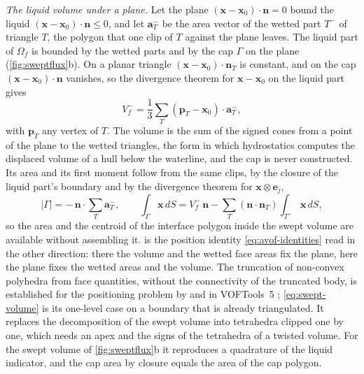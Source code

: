 \documentclass[preprint,12pt]{elsarticle}
\newcommand{\x}{\mathbf{x}}
\newcommand{\n}{\mathbf{n}}
\begin{document}
\emph{The liquid volume under a plane.} Let the plane $(\x - \x_0)\cdot\n = 0$ bound the liquid $(\x - \x_0)\cdot\n \le 0$, and let $\mathbf{a}_T^-$ be the area vector of the wetted part $T^-$ of triangle $T$, the polygon that one clip of $T$ against the plane leaves. The liquid part of $\Omega_f$ is bounded by the wetted parts and by the cap $\Gamma$ on the plane (\cref{fig:sweptflux}b). On a planar triangle $(\x - \x_0)\cdot\n_T$ is constant, and on the cap $(\x - \x_0)\cdot\n$ vanishes, so the divergence theorem for $\x - \x_0$ on the liquid part gives
\begin{equation}
V_f^- = \frac13\sum_T (\mathbf{p}_T - \x_0)\cdot\mathbf{a}_T^- ,
\label{eq:swept-volume}
\end{equation}
with $\mathbf{p}_T$ any vertex of $T$. The volume is the sum of the signed cones from a point of the plane to the wetted triangles, the form in which hydrostatics computes the displaced volume of a hull below the waterline, and the cap is never constructed. Its area and its first moment follow from the same clips, by the closure of the liquid part's boundary and by the divergence theorem for $\x\otimes\mathbf{e}_j$,
\begin{equation}
|\Gamma| = -\,\n\cdot\sum_T \mathbf{a}_T^- , \qquad
\int_\Gamma \x\,dS = V_f^-\,\n - \sum_T (\n\cdot\n_T)\int_{T^-}\x\,dS ,
\label{eq:swept-cap}
\end{equation}
so the area and the centroid of the interface polygon inside the swept volume are available without assembling it.  is the position identity \cref{eq:avof-identities} read in the other direction: there the volume and the wetted face areas fix the plane, here the plane fixes the wetted areas and the volume. The truncation of non-convex polyhedra from face quantities, without the connectivity of the truncated body, is established for the positioning problem by \citet{KromerBothe2022} and in VOFTools~5 \citep{LopezEtAl2020VOFTools5}; \cref{eq:swept-volume} is its one-level case on a boundary that is already triangulated. It replaces the decomposition of the swept volume into tetrahedra clipped one by one, which needs an apex and the signs of the tetrahedra of a twisted volume. For the swept volume of \cref{fig:sweptflux}b it reproduces a quadrature of the liquid indicator, and the cap area by closure equals the area of the cap polygon.


\end{document}
